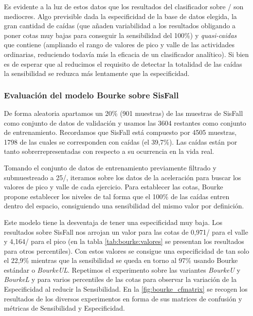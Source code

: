 Es evidente a la luz de estos datos que los resultados del clasificador sobre \sisfall/ son mediocres. Algo previsible dada la especificidad de la base de datos elegida, la gran cantidad de caídas (que añaden variabilidad a los resultados obligando a poner cotas muy bajas para conseguir la sensibilidad del 100\%) y \textit{quasi-caidas} que contiene (ampliando el rango de valores de pico y valle de las actividades ordinarias, reduciendo todavía más la eficacia de un clasificador analítico). Si bien es de esperar que al reducimos el requisito de detectar la totalidad de las caídas la sensibilidad se reduzca más lentamente que la especificidad.

\subsubsection{Evaluación del modelo Bourke sobre SisFall}

De forma aleatoria apartamos un 20\% (901 muestras) de las muestras de SisFall como conjunto de datos de validación y usamos las 3604 restantes como conjunto de entrenamiento. Recordamos que SisFall está compuesto por 4505 muestras, 1798 de las cuales se corresponden con caídas (el 39,7\%). Las caídas están por tanto sobrerrepresentadas con respecto a su ocurrencia en la vida real.

Tomando el conjunto de datos de entrenamiento previamente filtrado y submuestreado a 25\hz/, iteramos sobre los datos de la aceleración para buscar los valores de pico y valle de cada ejercicio. Para establecer las cotas, Bourke propone establecer los niveles de tal forma que el 100\% de las caídas entren dentro del espacio, consiguiendo una sensibilidad del mismo valor por definición. 


  Este modelo tiene la desventaja de tener una especificidad muy baja. Los resultados sobre SisFall nos arrojan un valor para las cotas de 0,971\g/ para el valle y 4,164\g/ para el pico (en la tabla \ref{tab:bourke:valores} se presentan los resultados para otros percentiles). Con estos valores se consigue una especificidad de tan solo el 22,9\% mientras que la sensibilidad se queda en torno al 97\% usando Bourke estándar o \textit{BourkeUL}. Repetimos el experimento sobre las variantes \textit{BourkeU} y \textit{BourkeL} y para varios percentiles de las cotas para observar la variación de la Especificidad al reducir la Sensibilidad. En la \autoref{fig:bourke_cfmatrix} se recogen los resultados de los diversos experimentos en forma de sus matrices de confusión y métricas de Sensibilidad y Especificidad.  


